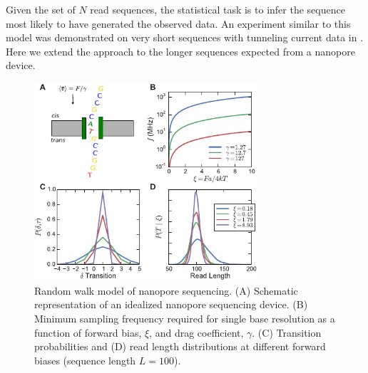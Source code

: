 \documentclass{biophys_letter}
\begin{document}
\twocolumn

Given the set of $N$ read sequences, the statistical task is to infer the sequence most likely to have generated the observed data.
An experiment similar to this model was demonstrated on very short sequences with tunneling current data in \cite{Ohshiro:2012}.
Here we extend the approach to the longer sequences expected from a nanopore device.

\begin{figure}
  \centering
  \includegraphics[width=3.25in]{fig/new_fig1_withcartoon.pdf}
  \caption{Random walk model of nanopore sequencing. (A) Schematic representation of an idealized nanopore sequencing device. (B) Minimum sampling frequency required for single base resolution as a function of forward bias, $\xi$, and drag coefficient, $\gamma$. (C) Transition probabilities and (D) read length distributions at different forward biases (sequence length $L=100$).}
  \label{fig:fig1}
\end{figure}
\end{document}

